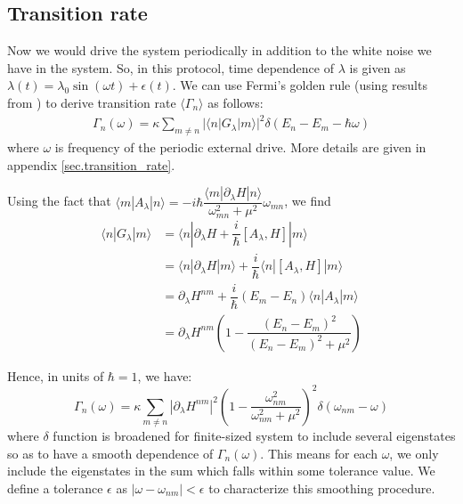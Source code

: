 \documentclass[11pt,a4paper]{article}
\begin{document}
\subsection{Transition rate}

Now we would drive the system periodically in addition to the white noise we have in the system. So, in this protocol, time dependence of $\lambda$ is given as $\lambda(t)= \lambda_0 \sin (\omega t) + \epsilon(t)$. We can use Fermi's golden rule (using results from \cite{clerk2010introduction}) to derive  transition rate $\langle \Gamma_n \rangle$ \cite{kolodrubetz2016geometry} as follows: 
\begin{align}
 \Gamma_n (\omega) = \kappa  \sum_{m \neq n} |\langle n | G_{\lambda} | m \rangle |^2 \delta(E_n-E_m- \hbar \omega)
\end{align}
where $\omega$ is frequency of the periodic external drive.   More details  are given in appendix \ref{sec.transition_rate}.

Using the fact that 
$\langle m |A_{\lambda} | n \rangle =  -i \hbar \dfrac{\langle m |\partial_{\lambda}H | n \rangle}{\omega_{mn}^2+ \mu^2} \omega_{mn}$, we find 
\begin{align*}
\langle n | G_{\lambda} | m \rangle &= \langle n |  \partial_{\lambda} H + \dfrac{i}{\hbar} [A_{\lambda}, H]  | m \rangle \\
&= \langle n |  \partial_{\lambda} H | m \rangle + \dfrac{i}{\hbar} \langle n |  [A_{\lambda}, H]  | m \rangle \\
&=   \partial_{\lambda} H^{nm} + \dfrac{i}{\hbar} (E_m-E_n)\langle n | A_{\lambda} | m \rangle \\
&=   \partial_{\lambda} H^{nm}\left(1 -  \dfrac{(E_n-E_m)^2}{(E_n-E_m)^2 + \mu^2} \right)  
\end{align*}

Hence, in units of $\hbar=1$, we have:
 \begin{equation}
 \boxed{
 \Gamma_n (\omega) = \kappa  \sum_{m \neq n} | \partial_{\lambda} H^{nm}|^2 \left(1 -  \dfrac{\omega_{nm}^2}{\omega_{nm}^2 + \mu^2} \right)^2 \delta(\omega_{nm}- \omega)}
\end{equation}
where $\delta$ function is broadened for finite-sized system to include several eigenstates so as to have a smooth dependence of  $\Gamma_n (\omega)$. This means for each $\omega$, we only include the eigenstates in the sum which falls within some tolerance value. We define a tolerance $\epsilon$ as $|\omega- \omega_{nm}|< \epsilon$ to characterize this smoothing procedure. 
\end{document}
